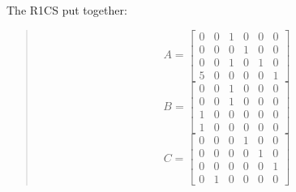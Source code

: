 The R1CS put together:
\begin{quote}
   \[
 A =
   \begin{bmatrix}
      0 & 0 & 1 & 0 & 0 & 0 \\
      0 & 0 & 0 & 1 & 0 & 0 \\
      0 & 0 & 1 & 0 & 1 & 0 \\
      5 & 0 & 0 & 0 & 0 & 1
   \end{bmatrix}
   \]
   \[
 B =
   \begin{bmatrix}
      0 & 0 & 1 & 0 & 0 & 0 \\
      0 & 0 & 1 & 0 & 0 & 0 \\
      1 & 0 & 0 & 0 & 0 & 0 \\
      1 & 0 & 0 & 0 & 0 & 0
   \end{bmatrix}
   \]
   \[
 C =
   \begin{bmatrix}
      0 & 0 & 0 & 1 & 0 & 0 \\
      0 & 0 & 0 & 0 & 1 & 0 \\
      0 & 0 & 0 & 0 & 0 & 1 \\
      0 & 1 & 0 & 0 & 0 & 0
   \end{bmatrix}
   \]
   \end{quote}
   
\cite{RC23}


